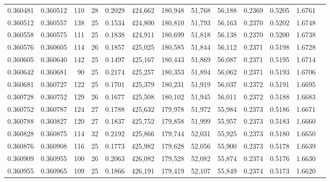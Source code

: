 \begin{tabular}{rrrrrrrrrrrrr}
0.360481 & 0.360512 &   110 &  28 &                                     0.2029 & 424,662 & 180,948 &  51,768 &  56,188 & 0.2369 & 0.5205 & 1.6761 \\
0.360512 & 0.360557 &   138 &  25 &                                     0.1534 & 424,800 & 180,810 &  51,793 &  56,163 & 0.2370 & 0.5202 & 1.6748 \\
0.360558 & 0.360575 &   111 &  25 &                                     0.1838 & 424,911 & 180,699 &  51,818 &  56,138 & 0.2370 & 0.5200 & 1.6738 \\
0.360576 & 0.360605 &   114 &  26 &                                     0.1857 & 425,025 & 180,585 &  51,844 &  56,112 & 0.2371 & 0.5198 & 1.6728 \\
0.360605 & 0.360640 &   142 &  25 &                                     0.1497 & 425,167 & 180,443 &  51,869 &  56,087 & 0.2371 & 0.5195 & 1.6714 \\
0.360642 & 0.360681 &    90 &  25 &                                     0.2174 & 425,257 & 180,353 &  51,894 &  56,062 & 0.2371 & 0.5193 & 1.6706 \\
0.360681 & 0.360727 &   122 &  25 &                                     0.1701 & 425,379 & 180,231 &  51,919 &  56,037 & 0.2372 & 0.5191 & 1.6695 \\
0.360728 & 0.360752 &   129 &  26 &                                     0.1677 & 425,508 & 180,102 &  51,945 &  56,011 & 0.2372 & 0.5188 & 1.6683 \\
0.360752 & 0.360787 &   124 &  27 &                                     0.1788 & 425,632 & 179,978 &  51,972 &  55,984 & 0.2373 & 0.5186 & 1.6671 \\
0.360788 & 0.360827 &   120 &  27 &                                     0.1837 & 425,752 & 179,858 &  51,999 &  55,957 & 0.2373 & 0.5183 & 1.6660 \\
0.360828 & 0.360875 &   114 &  32 &                                     0.2192 & 425,866 & 179,744 &  52,031 &  55,925 & 0.2373 & 0.5180 & 1.6650 \\
0.360876 & 0.360908 &   116 &  25 &                                     0.1773 & 425,982 & 179,628 &  52,056 &  55,900 & 0.2373 & 0.5178 & 1.6639 \\
0.360909 & 0.360955 &   100 &  26 &                                     0.2063 & 426,082 & 179,528 &  52,082 &  55,874 & 0.2374 & 0.5176 & 1.6630 \\
0.360955 & 0.360965 &   109 &  25 &                                     0.1866 & 426,191 & 179,419 &  52,107 &  55,849 & 0.2374 & 0.5173 & 1.6620 \\

\end{tabular}
